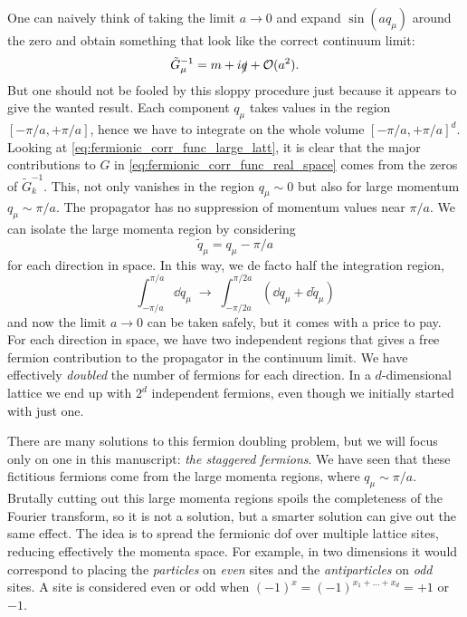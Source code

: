 One can naively think of taking the limit $a \to 0$ and expand $\sin(a q_{\mu})$ around the zero and obtain something that look like the correct continuum limit:
\begin{equation}
    \tilde{G}_{\mu}^{-1} = m + i \slashed{q} + \mathcal{O}(a^2).
\end{equation}
But one should not be fooled by this sloppy procedure just because it appears to give the wanted result.
Each component $q_{\mu}$ takes values in the region $[-\pi/a, +\pi/a]$, hence we have to integrate on the whole volume $[-\pi/a, +\pi/a]^d$.
Looking at \eqref{eq:fermionic_corr_func_large_latt}, it is clear that the major contributions to $G$ in \eqref{eq:fermionic_corr_func_real_space} comes from the zeros of $\tilde{G}_k^{-1}$.
This, not only vanishes in the region $q_{\mu} \sim 0$ but also for large momentum $q_{\mu} \sim \pi/a$.
The propagator has no suppression of momentum values near $\pi/a$.
We can isolate the large momenta region by considering
\begin{equation}
    \tilde{q}_{\mu} = q_{\mu} - \pi/a
\end{equation}
for each direction in space.
In this way, we de facto half the integration region,
\begin{equation}
    \int_{-\pi/a}^{\pi/a} \dd q_{\mu} \;\to\;
    \int_{-\pi/2a}^{\pi/2a} (\dd q_{\mu} + \dd \tilde{q}_{\mu})
\end{equation}
and now the limit $a \to 0$ can be taken safely, but it comes with a price to pay.
For each direction in space, we have two independent regions that gives a free fermion contribution to the propagator in the continuum limit.
We have effectively \emph{doubled} the number of fermions for each direction.
In a $d$-dimensional lattice we end up with $2^d$ independent fermions, even though we initially started with just one.


There are many solutions to this fermion doubling problem\citneeded, but we will focus only on one in this manuscript: \emph{the staggered fermions}\citneeded.
We have seen that these fictitious fermions come from the large momenta regions, where $q_{\mu} \sim \pi/a$.
Brutally cutting out this large momenta regions spoils the completeness of the Fourier transform, so it is not a solution, but a smarter solution can give out the same effect.
The idea is to spread the fermionic \ac{dof} over multiple lattice sites, reducing effectively the momenta space.
For example, in two dimensions it would correspond to placing the \emph{particles} on \emph{even} sites and the \emph{antiparticles} on \emph{odd} sites.
A site is considered even or odd when $(-1)^x = (-1)^{x_1 + \dots + x_d} = +1$ or $-1$.

